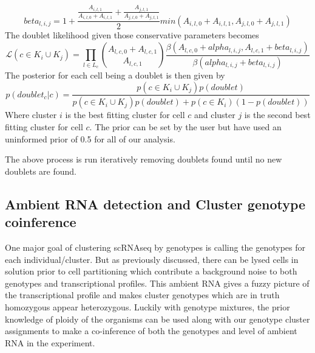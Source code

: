 \begin{equation}
beta_{l,i,j} = 1 + \frac{\frac{A_{i,l,1}}{A_{i,l,0}+A_{i,l,1}} + \frac{A_{j,l,1}}{A_{j,l,0}+A_{j,l,1}}}{2}min(A_{i,l,0}+A_{i,l,1}, A_{j,l,0}+A_{j,l,1})
\end{equation}
The doublet likelihood given those conservative parameters becomes
\begin{equation}
\mathcal{L}(c \in K_i \cup K_j) = \prod_{l \in L_c}  {A_{l,c,0} + A_{l,c,1}  \choose A_{l,c,1}}\frac{\beta(A_{l,c,0} + alpha_{l,i,j}, A_{l,c,1} + beta_{l,i,j})}{\beta(alpha_{l,i,j} + beta_{l,i,j})}
\end{equation}
The posterior for each cell being a doublet is then given by
\begin{equation}
p(doublet_c | c) = \frac{p(c \in K_i \cup K_j)p(doublet)}{p(c \in K_i \cup K_j)p(doublet) + p(c \in K_i)(1-p(doublet))}
\end{equation}
Where cluster $i$ is the best fitting cluster for cell $c$ and cluster $j$ is the second best fitting cluster for cell $c$. The prior can be set by the user but have used an uninformed prior of 0.5 for all of our analysis. 
\par{The above process is run iteratively removing doublets found until no new doublets are found.} 





\subsection{Ambient RNA detection and Cluster genotype coinference}
\par{One major goal of clustering scRNAseq by genotypes is calling the genotypes for each individual/cluster.
But as previously discussed, there can be lysed cells in solution prior to cell partitioning which contribute a background noise to both genotypes and transcriptional profiles. 
This ambient RNA gives a fuzzy picture of the transcriptional profile and makes cluster genotypes which are in truth homozygous appear heterozygous. 
Luckily with genotype mixtures, the prior knowledge of ploidy of the organisms can be used along with our genotype cluster assignments to 
make a co-inference of both the genotypes and level of ambient RNA in the experiment.
}

